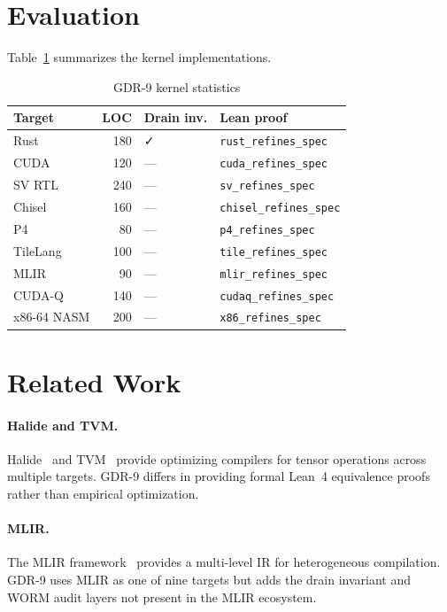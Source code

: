\documentclass[10pt,conference]{IEEEtran}
\begin{document}

\section{Evaluation}

Table~\ref{tab:stats} summarizes the kernel implementations.

\begin{table}[h]
\caption{GDR-9 kernel statistics}
\label{tab:stats}
\centering
\begin{tabular}{lrll}
\toprule
Target & LOC & Drain inv. & Lean proof \\
\midrule
Rust        & 180  & ✓ & \texttt{rust\_refines\_spec} \\
CUDA        & 120  & — & \texttt{cuda\_refines\_spec} \\
SV RTL      & 240  & — & \texttt{sv\_refines\_spec} \\
Chisel      & 160  & — & \texttt{chisel\_refines\_spec} \\
P4          & 80   & — & \texttt{p4\_refines\_spec} \\
TileLang    & 100  & — & \texttt{tile\_refines\_spec} \\
MLIR        & 90   & — & \texttt{mlir\_refines\_spec} \\
CUDA-Q      & 140  & — & \texttt{cudaq\_refines\_spec} \\
x86-64 NASM & 200  & — & \texttt{x86\_refines\_spec} \\
\bottomrule
\end{tabular}
\end{table}


\section{Related Work}

\paragraph{Halide and TVM.}
Halide~\cite{ragan2013halide} and TVM~\cite{chen2018tvm} provide optimizing
compilers for tensor operations across multiple targets. GDR-9 differs in
providing formal Lean~4 equivalence proofs rather than empirical optimization.

\paragraph{MLIR.}
The MLIR framework~\cite{lattner2021mlir} provides a multi-level IR for
heterogeneous compilation. GDR-9 uses MLIR as one of nine targets but adds
the drain invariant and WORM audit layers not present in the MLIR ecosystem.
\end{document}
